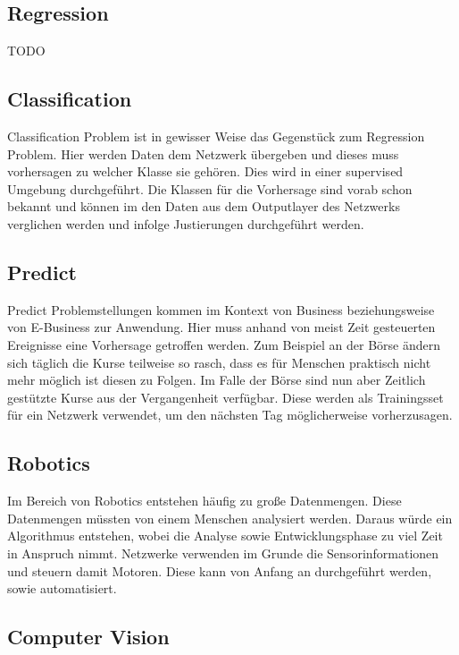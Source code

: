 \subsection{Regression}
\label{subsec:Regression}

TODO

\subsection{Classification}
\label{subsec:Classification}

Classification Problem ist in gewisser Weise das Gegenstück zum Regression Problem. 
Hier werden Daten dem Netzwerk übergeben und dieses muss vorhersagen zu welcher Klasse sie gehören. Dies wird in einer supervised Umgebung durchgeführt. 
Die Klassen für die Vorhersage sind vorab schon bekannt und können im den Daten aus dem Outputlayer des Netzwerks  verglichen werden und infolge Justierungen durchgeführt werden.

\subsection{Predict}
\label{subsec:Predict}

Predict Problemstellungen kommen im Kontext von Business beziehungsweise von E-Business zur Anwendung. 
Hier muss anhand von meist Zeit gesteuerten Ereignisse eine Vorhersage getroffen werden. 
Zum Beispiel an der Börse ändern sich täglich die Kurse teilweise so rasch, dass es für Menschen praktisch nicht mehr möglich ist diesen zu Folgen. 
Im Falle der Börse sind nun aber Zeitlich gestützte Kurse aus der Vergangenheit verfügbar. 
Diese werden als Trainingsset für ein Netzwerk verwendet, um den nächsten Tag möglicherweise vorherzusagen. 

\subsection{Robotics}
\label{subsec:Robotics}

Im Bereich von Robotics entstehen häufig zu große Datenmengen. 
Diese Datenmengen müssten von einem Menschen analysiert werden. 
Daraus würde ein Algorithmus entstehen, wobei die Analyse sowie Entwicklungsphase zu viel Zeit in Anspruch nimmt. 
Netzwerke verwenden im Grunde die Sensorinformationen und steuern damit Motoren. 
Diese kann von Anfang an durchgeführt werden, sowie automatisiert.

\subsection{Computer Vision}
\label{subsec:Cumputer Vision}

